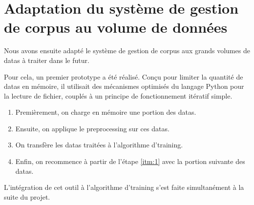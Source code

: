 \section{Adaptation du système de gestion de corpus au volume de données}
Nous avons ensuite adapté le système de gestion de corpus aux grands volumes de \glspl{data} à traiter dans le futur.

Pour cela, un premier prototype a été réalisé.
Conçu pour limiter la quantité de \glspl{data} en mémoire,
il utilisait des mécanismes optimisés du langage Python pour la lecture de fichier, couplés à un principe de fonctionnement itératif simple.

\begin{enumerate}
	\item Premièrement, on charge en mémoire une portion des \glspl{data}. \label{itm:1}
	\item Ensuite, on applique le \gls{preprocessing} sur ces \glspl{data}.
	\item On transfère les \glspl{data} traitées à l'algorithme d'\gls{training}.
	\item Enfin, on recommence à partir de l'étape \ref{itm:1} avec la portion suivante des \glspl{data}.
\end{enumerate}
\vspace{1em}

L'intégration de cet outil à l'algorithme d'\gls{training} s'est faite simultanément à la suite du projet.